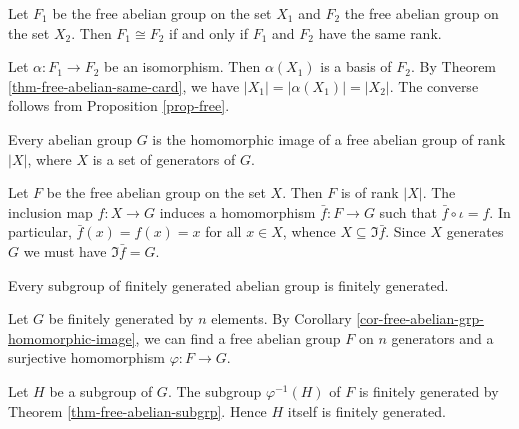 
\begin{corollary} \label{cor-free-abelian-isom}
	Let $F_1$ be the free abelian group on the set $X_1$ and $F_2$ the free abelian group on the set $X_2$. Then $F_1 \cong F_2$ if and only if $F_1$ and $F_2$ have the same rank.
\end{corollary}
\begin{sketch}
	Let  $\alpha : F_1\rightarrow F_2$ be an isomorphism. Then $\alpha(X_1)$ is a basis of $F_2$. By Theorem \ref{thm-free-abelian-same-card}, we have $|X_1| = |\alpha(X_1)| = |X_2|$. The converse follows from Proposition \ref{prop-free}. 
\end{sketch}

\begin{corollary} \label{cor-free-abelian-grp-homomorphic-image}
	Every abelian group $G$ is the homomorphic image of a free abelian group of rank $|X|$, where $X$ is a set of generators of $G$.
\end{corollary}
\begin{sketch}
	Let $F$ be the free abelian group on the set $X$. Then $F$ is of rank $|X|$. The inclusion map $f:X \to G$ induces a homomorphism $\bar{f} \colon F \to G$ such that $\bar{f}\circ\iota = f$. In particular, $\bar{f}(x) = f(x) = x$ for all $x\in X$, whence $X \subseteq \Im \bar{f}$. Since $X$ generates $G$ we must have $\Im \bar{f} = G$.
\end{sketch}

\begin{corollary} \label{cor-subgrp-FGAG-is-FG}
	Every subgroup of finitely generated abelian group is finitely generated.
\end{corollary}
\begin{sketch}
	Let $G$ be finitely generated by $n$ elements. By Corollary \ref{cor-free-abelian-grp-homomorphic-image},  we can find a free abelian group $F$ on $n$ generators and a surjective homomorphism
	$\varphi: F \to G $. 
	
	Let $H$ be a subgroup of $G$. The subgroup $\varphi^{-1}(H)$ of $F$ is finitely generated by Theorem \ref{thm-free-abelian-subgrp}. Hence $H$ itself is finitely generated.
\end{sketch}


